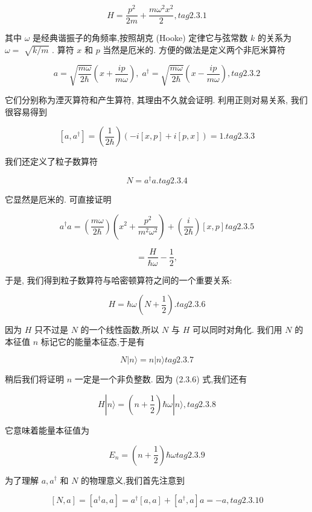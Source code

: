 \documentclass[lang=cn,newtx,10pt,scheme=chinese,thmcnt=section]{elegantbook}
\begin{document}
$$
H = \frac{{p}^{2}}{2m} + \frac{m{\omega }^{2}{x}^{2}}{2}, tag{2.3.1}
$$

其中 $\omega$ 是经典谐振子的角频率,按照胡克 (Hooke) 定律它与弦常数 $k$ 的关系为 $\omega =$ $\sqrt{k/m}$ . 算符 $x$ 和 $p$ 当然是厄米的. 方便的做法是定义两个非厄米算符

$$
a = \sqrt{\frac{m\omega }{2\hbar }}\left( {x + \frac{ip}{m\omega }}\right) ,\;{a}^{ \dagger } = \sqrt{\frac{m\omega }{2\hbar }}\left( {x - \frac{ip}{m\omega }}\right) , tag{2.3.2}
$$

它们分别称为湮灭算符和产生算符, 其理由不久就会证明. 利用正则对易关系, 我们很容易得到

$$
\left\lbrack {a,{a}^{ \dagger }}\right\rbrack = \left( \frac{1}{2\hbar }\right) \left( {-i\left\lbrack {x, p}\right\rbrack + i\left\lbrack {p, x}\right\rbrack }\right) = 1. tag{2.3.3}
$$

我们还定义了粒子数算符

$$
N = {a}^{ \dagger }a. tag{2.3.4}
$$

它显然是厄米的. 可直接证明

$$
{a}^{ \dagger }a = \left( \frac{m\omega }{2\hbar }\right) \left( {{x}^{2} + \frac{{p}^{2}}{{m}^{2}{\omega }^{2}}}\right) + \left( \frac{i}{2\hbar }\right) \left\lbrack {x, p}\right\rbrack tag{2.3.5}
$$

$$
= \frac{H}{\hbar \omega } - \frac{1}{2},
$$

于是, 我们得到粒子数算符与哈密顿算符之间的一个重要关系:

$$
H = \hbar \omega \left( {N + \frac{1}{2}}\right) . tag{2.3.6}
$$

因为 $H$ 只不过是 $N$ 的一个线性函数,所以 $N$ 与 $H$ 可以同时对角化. 我们用 $N$ 的本征值 $n$ 标记它的能量本征态,于是有

$$
N\left| {n\rangle = n}\right| n\rangle tag{2.3.7}
$$

稍后我们将证明 $n$ 一定是一个非负整数. 因为 (2.3.6) 式,我们还有

$$
H\left| {n\rangle = \left( {n + \frac{1}{2}}\right) \hbar \omega }\right| n\rangle , tag{2.3.8}
$$

它意味着能量本征值为

$$
{E}_{n} = \left( {n + \frac{1}{2}}\right) \hbar \omega tag{2.3.9}
$$

为了理解 $a,{a}^{ \dagger }$ 和 $N$ 的物理意义,我们首先注意到

$$
\left\lbrack {N, a}\right\rbrack = \left\lbrack {{a}^{ \dagger }a, a}\right\rbrack = {a}^{ \dagger }\left\lbrack {a, a}\right\rbrack + \left\lbrack {{a}^{ \dagger }, a}\right\rbrack a = - a, tag{2.3.10}
$$
\end{document}
